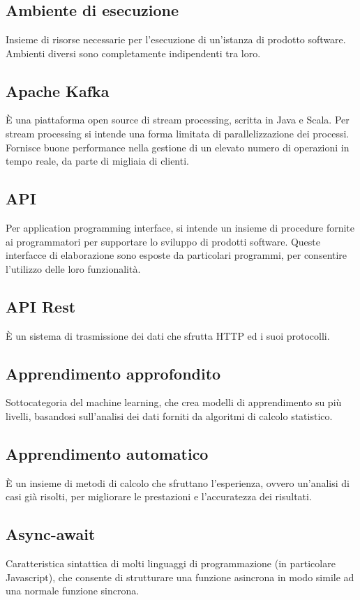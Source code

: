   \section{}
	\subsection*{Ambiente di esecuzione}
	Insieme di risorse necessarie per l'esecuzione di un'istanza di prodotto software. Ambienti diversi sono completamente indipendenti tra loro.
	\subsection*{Apache Kafka}
	È una piattaforma open source di stream processing, scritta in Java e Scala. Per stream processing si intende una forma limitata di parallelizzazione dei processi. Fornisce buone performance nella gestione di un elevato numero di operazioni in tempo reale, da parte di migliaia di clienti.
	\subsection*{API}
	Per application programming interface, si intende un insieme di procedure fornite ai programmatori per supportare lo sviluppo di prodotti software. Queste interfacce di elaborazione sono esposte da particolari programmi, per consentire l’utilizzo delle loro funzionalità.
	\subsection*{API Rest}
	È un sistema di trasmissione dei dati che sfrutta HTTP ed i suoi protocolli.
	\subsection*{Apprendimento approfondito}
	Sottocategoria del machine learning, che crea modelli di apprendimento su più livelli, basandosi sull’analisi dei dati forniti da algoritmi di calcolo statistico.
	\subsection*{Apprendimento automatico}
	È un insieme di metodi di calcolo che sfruttano l’esperienza, ovvero un’analisi di casi già risolti, per migliorare le prestazioni e l’accuratezza dei risultati.
	\subsection*{Async-await}
	Caratteristica sintattica di molti linguaggi di programmazione (in particolare Javascript), che consente di strutturare una funzione asincrona in modo simile ad una normale funzione sincrona.
